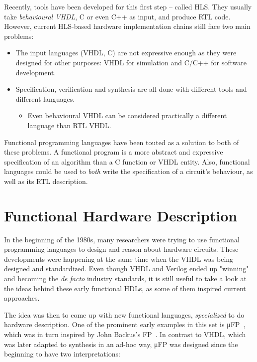         Recently, tools have been developed for this first step – called \ac{HLS}.
        They usually take \emph{behavioural \acs{VHDL}}, C or even C++ as input, and produce \ac{RTL} code.
        However, current \acs{HLS}-based hardware implementation chains still face two main problems:

        \begin{itemize}
            \item The input languages (VHDL, C) are not expressive enough as they were designed for other purposes:
                \acs{VHDL} for simulation and C/C++ for software development.
            \item Specification, verification and synthesis are all done with different tools and different languages.
            \begin{itemize}
                \item Even behavioural \acs{VHDL} can be considered practically a different language
                    than \acl{RTL} \acs{VHDL}.
            \end{itemize}
        \end{itemize}

        Functional programming languages have been touted as a solution to both of these problems.
        A functional program is a more abstract and expressive specification of an algorithm than
        a C function or VHDL entity.
        Also, functional languages could be used to \emph{both} write the specification of a circuit's behaviour,
        as well as its \acl{RTL} description.


    \section{Functional Hardware Description}
    \label{sec:functional-hardware}
        In the beginning of the 1980s, many researchers were trying to use functional programming languages
        to design and reason about hardware circuits.
        These developments were happening at the same time when the \ac{VHDL} was being designed and standardized.
        Even though \ac{VHDL} and Verilog ended up "winning" and becoming the \emph{de facto} industry standards,
        it is still useful to take a look at the ideas behind these early functional \acp{HDL},
        as some of them inspired current approaches.

        The idea was then to come up with new functional languages, \emph{specialized} to do hardware description.
        One of the prominent early examples in this set is μFP~\cite{mufp-1984},
        which was in turn inspired by John Backus's FP~.
        In contrast to \ac{VHDL}, which was later adapted to synthesis in an ad-hoc way,
        μFP was designed since the beginning to have two interpretations:

